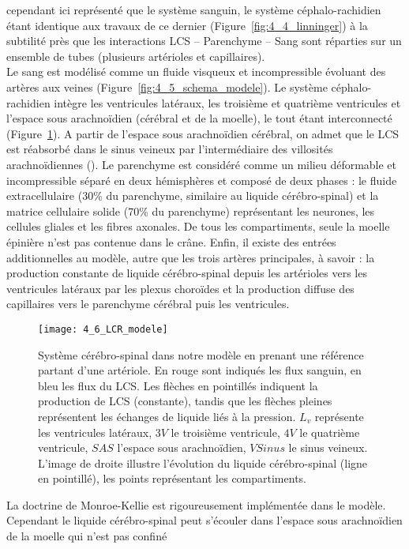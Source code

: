 cependant ici représenté que le système sanguin, le système céphalo-rachidien étant identique aux
travaux de ce dernier (Figure~\ref{fig:4_4_linninger}) à la subtilité près que les interactions LCS – Parenchyme – Sang sont
réparties sur un ensemble de tubes (plusieurs artérioles et capillaires).\\
Le sang est modélisé comme un fluide visqueux et incompressible évoluant des artères aux veines
(Figure~\ref{fig:4_5_schema_modele}). Le système céphalo-rachidien intègre les ventricules latéraux, les troisième et quatrième
ventricules et l’espace sous arachnoïdien (cérébral et de la moelle), le tout étant interconnecté (Figure~\ref{fig:4_6_LCR_modele}). A partir de l’espace sous arachnoïdien cérébral, on admet que le LCS est réabsorbé dans le sinus
veineux par l’intermédiaire des villosités arachnoïdiennes (\cite{Segal2001}). Le parenchyme est considéré comme
un milieu déformable et incompressible séparé en deux hémisphères et composé de deux phases : le
fluide extracellulaire (30\% du parenchyme, similaire au liquide cérébro-spinal) et la matrice cellulaire
solide (70\% du parenchyme) représentant les neurones, les cellules gliales et les fibres axonales. De
tous les compartiments, seule la moelle épinière n’est pas contenue dans le crâne. Enfin, il existe des
entrées additionnelles au modèle, autre que les trois artères principales, à savoir : la production constante de liquide cérébro-spinal depuis les artérioles vers les ventricules latéraux par les plexus
choroïdes et la production diffuse des capillaires vers le parenchyme cérébral puis les ventricules.\\
\begin{figure}[!t]
\centering
\texttt{[image: 4\_6\_LCR\_modele]}
\caption{Système cérébro-spinal dans notre modèle en prenant une référence partant d’une artériole. En rouge sont
indiqués les flux sanguin, en bleu les flux du LCS. Les flèches en pointillés indiquent la production de LCS (constante), tandis
que les flèches pleines représentent les échanges de liquide liés à la pression. $L_v$ représente les ventricules latéraux, $3V$ le
troisième ventricule, $4V$ le quatrième ventricule, $SAS$ l’espace sous arachnoïdien, $VSinus$ le sinus veineux. L’image de droite
illustre l’évolution du liquide cérébro-spinal (ligne en pointillé), les points représentant les compartiments.}
\label{fig:4_6_LCR_modele}	
\end{figure}
La doctrine de Monroe-Kellie est rigoureusement implémentée dans le modèle. Cependant le
liquide cérébro-spinal peut s’écouler dans l’espace sous arachnoïdien de la moelle qui n’est pas confiné
